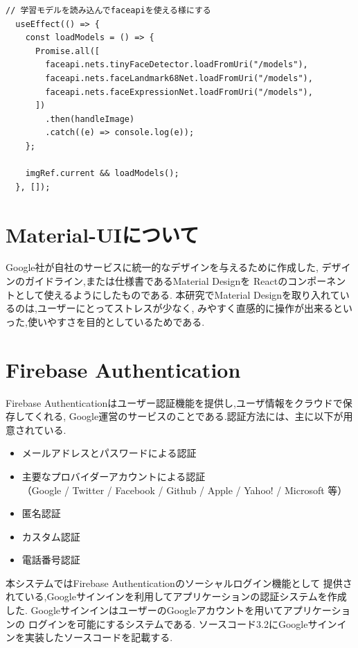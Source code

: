 \begin{lstlisting}[caption=表情分析]
  // 学習モデルを読み込んでfaceapiを使える様にする
  useEffect(() => {
    const loadModels = () => {
      Promise.all([
        faceapi.nets.tinyFaceDetector.loadFromUri("/models"),
        faceapi.nets.faceLandmark68Net.loadFromUri("/models"),
        faceapi.nets.faceExpressionNet.loadFromUri("/models"),
      ])
        .then(handleImage)
        .catch((e) => console.log(e));
    };

    imgRef.current && loadModels();
  }, []);
\end{lstlisting}
	
\section{Material-UIについて}
\label{sec:reference_material}
Google社が自社のサービスに統一的なデザインを与えるために作成した,
デザインのガイドライン,または仕様書であるMaterial Designを
Reactのコンポーネントとして使えるようにしたものである.
本研究でMaterial Designを取り入れているのは,ユーザーにとってストレスが少なく,
みやすく直感的に操作が出来るといった,使いやすさを目的としているためである.

\section{Firebase Authentication}
\label{sec:reference_auth}
Firebase Authenticationはユーザー認証機能を提供し,ユーザ情報をクラウドで保存してくれる,
Google運営のサービスのことである.認証方法には、主に以下が用意されている.

\begin{itemize}
	\item メールアドレスとパスワードによる認証 \\

	\item 主要なプロバイダーアカウントによる認証 \\
	（Google / Twitter / Facebook / Github / Apple / Yahoo! / Microsoft 等） \\

	\item 匿名認証 \\

	\item カスタム認証 \\

	\item 電話番号認証 \\
\end{itemize}

本システムではFirebase Authenticationのソーシャルログイン機能として
提供されている,Googleサインインを利用してアプリケーションの認証システムを作成した. 
GoogleサインインはユーザーのGoogleアカウントを用いてアプリケーションの
ログインを可能にするシステムである. 
ソースコード3.2にGoogleサインインを実装したソースコードを記載する. \\

